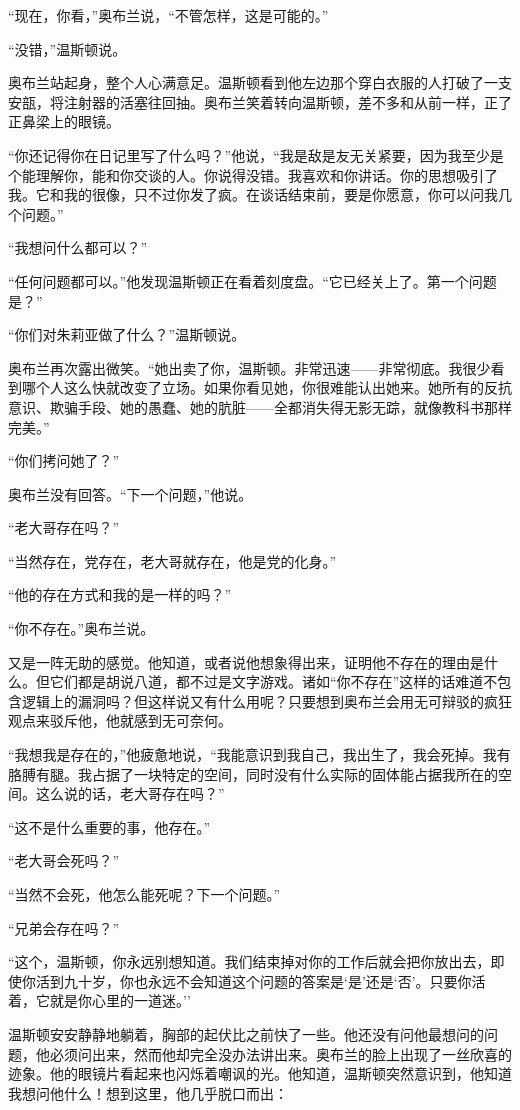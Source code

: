 ``现在，你看，''奥布兰说，``不管怎样，这是可能的。''

``没错，''温斯顿说。

奥布兰站起身，整个人心满意足。温斯顿看到他左边那个穿白衣服的人打破了一支安瓿，将注射器的活塞往回抽。奥布兰笑着转向温斯顿，差不多和从前一样，正了正鼻梁上的眼镜。

``你还记得你在日记里写了什么吗？''他说，``我是敌是友无关紧要，因为我至少是个能理解你，能和你交谈的人。你说得没错。我喜欢和你讲话。你的思想吸引了我。它和我的很像，只不过你发了疯。在谈话结束前，要是你愿意，你可以问我几个问题。''

``我想问什么都可以？''

``任何问题都可以。''他发现温斯顿正在看着刻度盘。``它已经关上了。第一个问题是？''

``你们对朱莉亚做了什么？''温斯顿说。

奥布兰再次露出微笑。``她出卖了你，温斯顿。非常迅速------非常彻底。我很少看到哪个人这么快就改变了立场。如果你看见她，你很难能认出她来。她所有的反抗意识、欺骗手段、她的愚蠢、她的肮脏------全都消失得无影无踪，就像教科书那样完美。''

``你们拷问她了？''

奥布兰没有回答。``下一个问题，''他说。

``老大哥存在吗？''

``当然存在，党存在，老大哥就存在，他是党的化身。''

``他的存在方式和我的是一样的吗？''

``你不存在。''奥布兰说。

又是一阵无助的感觉。他知道，或者说他想象得出来，证明他不存在的理由是什么。但它们都是胡说八道，都不过是文字游戏。诸如``你不存在''这样的话难道不包含逻辑上的漏洞吗？但这样说又有什么用呢？只要想到奥布兰会用无可辩驳的疯狂观点来驳斥他，他就感到无可奈何。

``我想我是存在的，''他疲惫地说，``我能意识到我自己，我出生了，我会死掉。我有胳膊有腿。我占据了一块特定的空间，同时没有什么实际的固体能占据我所在的空间。这么说的话，老大哥存在吗？''

``这不是什么重要的事，他存在。''

``老大哥会死吗？''

``当然不会死，他怎么能死呢？下一个问题。''

``兄弟会存在吗？''

``这个，温斯顿，你永远别想知道。我们结束掉对你的工作后就会把你放出去，即使你活到九十岁，你也永远不会知道这个问题的答案是`是'还是`否'。只要你活着，它就是你心里的一道迷。''

温斯顿安安静静地躺着，胸部的起伏比之前快了一些。他还没有问他最想问的问题，他必须问出来，然而他却完全没办法讲出来。奥布兰的脸上出现了一丝欣喜的迹象。他的眼镜片看起来也闪烁着嘲讽的光。他知道，温斯顿突然意识到，他知道我想问他什么！想到这里，他几乎脱口而出：


